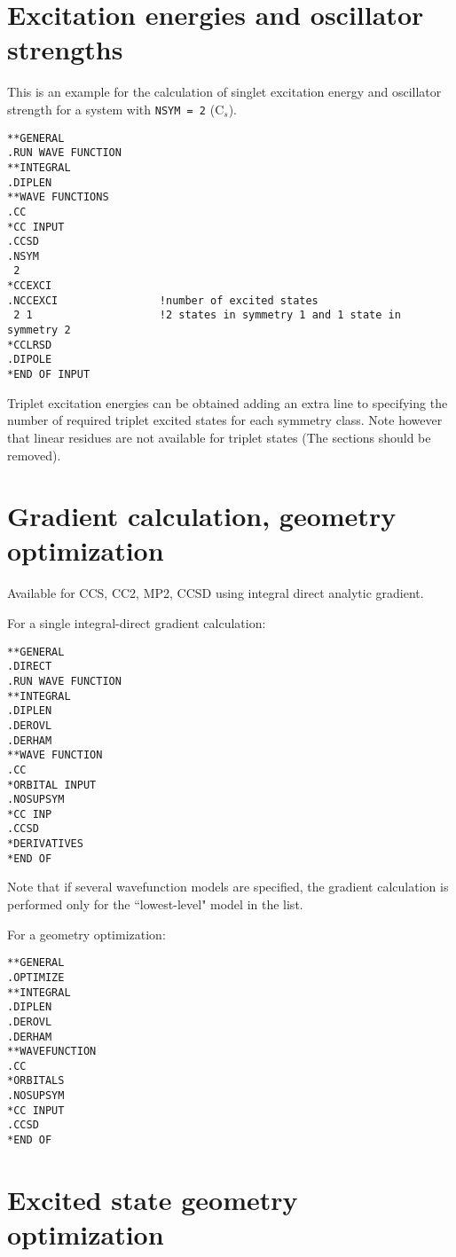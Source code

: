 \section{Excitation energies and oscillator strengths}
This is an example for the calculation of singlet excitation energy and
oscillator strength for a system with \verb+NSYM = 2+ (C$_s$).
\begin{verbatim}
**GENERAL
.RUN WAVE FUNCTION
**INTEGRAL
.DIPLEN
**WAVE FUNCTIONS
.CC
*CC INPUT
.CCSD
.NSYM
 2
*CCEXCI
.NCCEXCI                !number of excited states
 2 1                    !2 states in symmetry 1 and 1 state in symmetry 2
*CCLRSD
.DIPOLE
*END OF INPUT
\end{verbatim}
Triplet excitation energies can be obtained adding
an extra line to  specifying the number 
of required triplet excited states for each symmetry class.  
Note however that linear residues are not available
for triplet states (The  sections should be removed).

\section{Gradient calculation, geometry optimization}
Available for CCS, CC2, MP2, CCSD using integral direct analytic gradient.

\noindent For a single integral-direct gradient calculation:
\begin{verbatim}
**GENERAL
.DIRECT
.RUN WAVE FUNCTION
**INTEGRAL
.DIPLEN
.DEROVL
.DERHAM
**WAVE FUNCTION
.CC
*ORBITAL INPUT
.NOSUPSYM
*CC INP
.CCSD
*DERIVATIVES
*END OF
\end{verbatim}
Note that if several wavefunction models are specified, 
the gradient calculation is performed only for the ``lowest-level" 
model in the list.

\noindent For a geometry optimization:
\begin{verbatim}
**GENERAL
.OPTIMIZE
**INTEGRAL
.DIPLEN
.DEROVL
.DERHAM
**WAVEFUNCTION
.CC
*ORBITALS
.NOSUPSYM
*CC INPUT
.CCSD
*END OF
\end{verbatim}

\section{Excited state geometry optimization}

